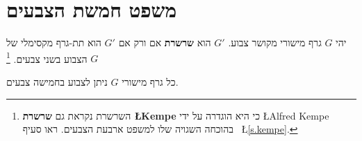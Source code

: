 
\section{משפט חמשת הצבעים}\label{s.five-color}

\begin{definition}
יהי
$G$
גרף מישורי מקושר צבוע. 
$G'$
הוא
\textbf{שרשרת}
אם ורק אם
$G'$
הוא תת-גרף מקסימלי של
$G$
הצבוע בשני צבעים.%
\footnote{%
השרשרת נקראת גם
\textbf{שרשרת \L{Kempe}}
כי היא הוגדרה על ידי
\L{Alfred Kempe}
בהוכחה השגויה שלו למשפט ארבעת הצבעים. ראו סעיף~%
\L{\ref{s.kempe}}.}
\end{definition}

\begin{theorem}\label{thm.fivecolor}
כל גרף מישורי 
$G$
ניתן לצבוע בחמישה צבעים.
\end{theorem}

